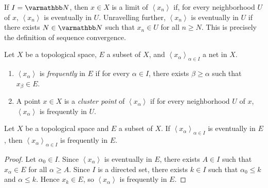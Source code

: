 \begin{example}
	If $I = \bfN$, then $x \in X$ is a limit of $\left<x_n \right>$ if, for every neighborhood $U$ of $x$, $\left<x_n \right>$ is eventually in $U$. Unravelling further, $\left<x_n \right>$ is eventually in $U$ if there exists $N \in \bfN$ such that $x_n \in U$ for all $n \geq N$. This is precisely the definition of sequence convergence.
\end{example}

\begin{definition}
	Let $X$ be a topological space, $E$ a subset of $X$, and $\left<x_\alpha \right>_{\alpha \in I}$ a net in $X$.
	\mbox{}
	\begin{enumerate}[label = (\arabic*),itemsep=1pt,topsep=3pt]
		\item $\left<x_\alpha \right>$ is \emph{frequently} in $E$ if for every $\alpha \in I$, there exists $\beta \geq \alpha$ such that $x_\beta \in E$.
		\item A point $x \in X$ is a \emph{cluster point} of $\left<x_\alpha \right>$ if for every neighborhood $U$ of $x$, $\left<x_\alpha \right>$ is frequently in $U$.
	\end{enumerate}
\end{definition}

\begin{proposition}
	Let $X$ be a topological space and $E$ a subset of $X$. If $\left<x_\alpha \right>_{\alpha \in I}$ is eventually in $E$, then $\left<x_\alpha \right>_{\alpha \in I}$ is frequently in $E$.
\end{proposition}
	\begin{proof}
		Let $\alpha_0 \in I$. Since $\left<x_\alpha \right>$ is eventually in $E$, there exists $A \in I$ such that $x_\alpha \in E$ for all $\alpha \geq A$. Since $I$ is a directed set, there exists $k \in I$ such that $\alpha_0 \leq k$ and $\alpha \leq k$. Hence $x_k \in E$, so $\left<x_\alpha \right>$ is frequently in $E$.
	\end{proof}

